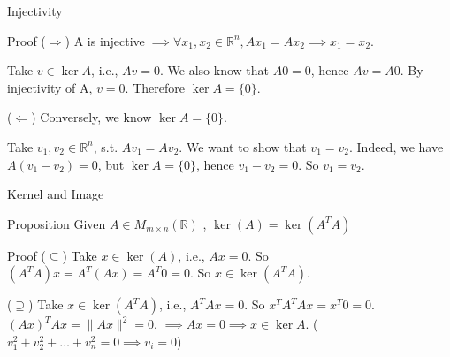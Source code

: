 \documentclass[aspectratio=169, UTF8]{ctexbeamer}
\begin{document}
\begin{frame}{Injectivity}
    \begin{block}{Proof}
        ($\Rightarrow$) A is injective$\;\implies\forall x_1, x_2 \in \mathbb{R}^n, Ax_1 = Ax_2 \implies x_1 = x_2$.

        Take $v \in \ker A$, i.e., $Av = 0$.
        We also know that $A0 = 0$, hence $Av = A0$.
        By injectivity of A, $v=0$. Therefore $\ker A = \{0\}$.
        \newline

        ($\Leftarrow$) Conversely, we know $\ker A = \{0\}$.
        
        Take $v_1, v_2 \in \mathbb{R}^n$, s.t. $Av_1 = Av_2$.
        We want to show that $v_1 = v_2$.
        Indeed, we have $A(v_1 - v_2) = 0$, but $\ker A = \{0\}$,
        hence $v_1 - v_2 = 0$. So $v_1 = v_2$.
    \end{block}
\end{frame}

\begin{frame}{Kernel and Image}
    \begin{block}{Proposition}
        Given $A \in M_{m \times n}(\mathbb{R})$ , $\ker(A) = \ker(A^T A)$
    \end{block}
    \begin{block}{Proof}
        ($\subseteq$) Take $x \in \ker(A)$, i.e., $Ax=0$.
        So $(A^T A)x = A^T(Ax) = A^T 0 = 0$.
        So $x \in \ker(A^T A)$.

        ($\supseteq$) Take $x \in \ker(A^T A)$, i.e., $A^T Ax = 0$.
        So $x^T A^T Ax = x^T 0 = 0$.
        $(Ax)^T Ax = \|Ax\|^2 = 0$.
        $\implies Ax = 0 \implies x \in \ker A$.
        ($v_1^2 + v_2^2 + \dots + v_n^2 = 0 \implies v_i = 0$)
    \end{block}
\end{frame}
\end{document}
